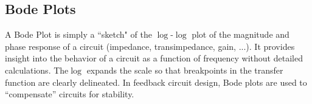 \subsection{Bode Plots}
A Bode Plot is simply a ``sketch" of the $\log$-$\log$ plot of the magnitude and phase response of a circuit (impedance, transimpedance, gain, ...).  It provides insight into the behavior of a circuit as a function of frequency without detailed calculations.  The$\log$ expands the scale so that breakpoints in the transfer function are clearly delineated.  In feedback circuit design, Bode plots are used to “compensate” circuits for stability.
